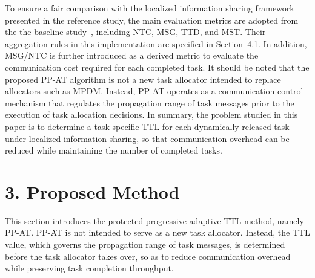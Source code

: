 \documentclass[type=submission,name=IR]{oae}
\begin{document}
To ensure a fair comparison with the localized information sharing framework presented in the reference study, the main evaluation metrics are adopted from the the baseline study~\cite{nayak2025limited}, including NTC, MSG, TTD, and MST. Their aggregation rules in this implementation are specified in Section~4.1. In addition, MSG/NTC is further introduced as a derived metric to evaluate the communication cost required for each completed task. It should be noted that the proposed PP-AT algorithm is not a new task allocator intended to replace allocators such as MPDM. Instead, PP-AT operates as a communication-control mechanism that regulates the propagation range of task messages prior to the execution of task allocation decisions. In summary, the problem studied in this paper is to determine a task-specific TTL for each dynamically released task under localized information sharing, so that communication overhead can be reduced while maintaining the number of completed tasks.



\section{3. Proposed Method}


This section introduces the protected progressive adaptive TTL method, namely PP-AT. PP-AT is not intended to serve as a new task allocator. Instead, ‌the TTL value, which governs the propagation range of task messages, is determined before the task allocator takes over‌, so as to reduce communication overhead while preserving task completion throughput.
\end{document}
